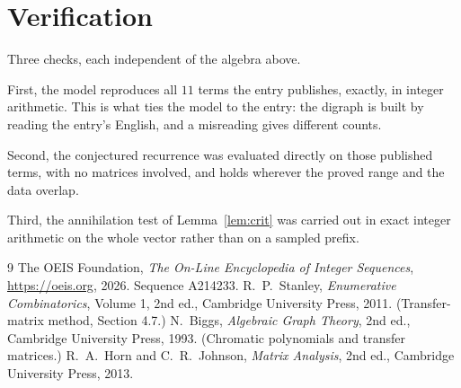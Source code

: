 \documentclass[11pt,a4paper]{article}
\theoremstyle{plain}
\theoremstyle{definition}
\begin{document}
\section{Verification}

Three checks, each independent of the algebra above.

First, the model reproduces all $11$ terms the entry publishes, exactly, in integer
arithmetic. This is what ties the model to the entry: the digraph is built by reading the
entry's English, and a misreading gives different counts.

Second, the conjectured recurrence was evaluated directly on those published terms, with no
matrices involved, and holds wherever the proved range and the data overlap.

Third, the annihilation test of Lemma~\ref{lem:crit} was carried out in exact integer
arithmetic on the whole vector rather than on a sampled prefix.

\begin{thebibliography}{9}
 The OEIS Foundation, \emph{The On-Line Encyclopedia of Integer
Sequences}, \url{https://oeis.org}, 2026. Sequence A214233.
 R.~P.~Stanley, \emph{Enumerative Combinatorics}, Volume 1, 2nd ed.,
Cambridge University Press, 2011. (Transfer-matrix method, Section 4.7.)
 N.~Biggs, \emph{Algebraic Graph Theory}, 2nd ed., Cambridge University
Press, 1993. (Chromatic polynomials and transfer matrices.)
 R.~A.~Horn and C.~R.~Johnson, \emph{Matrix Analysis}, 2nd ed., Cambridge
University Press, 2013.
\end{thebibliography}
\end{document}
